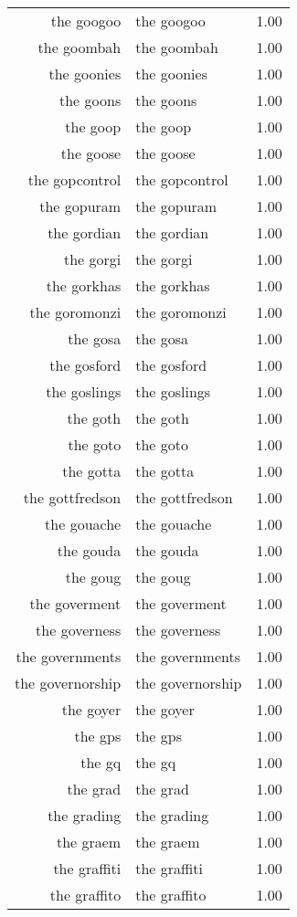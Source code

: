\begin{table}[ht]
\begin{tabular}{rlr}
  the googoo & the googoo & 1.00 \\ 
  the goombah & the goombah & 1.00 \\ 
  the goonies & the goonies & 1.00 \\ 
  the goons & the goons & 1.00 \\ 
  the goop & the goop & 1.00 \\ 
  the goose & the goose & 1.00 \\ 
  the gopcontrol & the gopcontrol & 1.00 \\ 
  the gopuram & the gopuram & 1.00 \\ 
  the gordian & the gordian & 1.00 \\ 
  the gorgi & the gorgi & 1.00 \\ 
  the gorkhas & the gorkhas & 1.00 \\ 
  the goromonzi & the goromonzi & 1.00 \\ 
  the gosa & the gosa & 1.00 \\ 
  the gosford & the gosford & 1.00 \\ 
  the goslings & the goslings & 1.00 \\ 
  the goth & the goth & 1.00 \\ 
  the goto & the goto & 1.00 \\ 
  the gotta & the gotta & 1.00 \\ 
  the gottfredson & the gottfredson & 1.00 \\ 
  the gouache & the gouache & 1.00 \\ 
  the gouda & the gouda & 1.00 \\ 
  the goug & the goug & 1.00 \\ 
  the goverment & the goverment & 1.00 \\ 
  the governess & the governess & 1.00 \\ 
  the governments & the governments & 1.00 \\ 
  the governorship & the governorship & 1.00 \\ 
  the goyer & the goyer & 1.00 \\ 
  the gps & the gps & 1.00 \\ 
  the gq & the gq & 1.00 \\ 
  the grad & the grad & 1.00 \\ 
  the grading & the grading & 1.00 \\ 
  the graem & the graem & 1.00 \\ 
  the graffiti & the graffiti & 1.00 \\ 
  the graffito & the graffito & 1.00 \\ 

\end{tabular}
\end{table}
